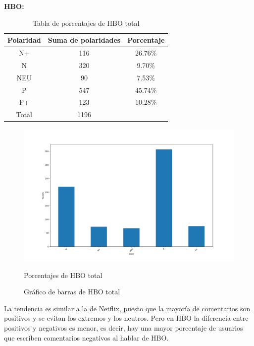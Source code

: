 \textbf{HBO: }


\begin{table}[H]
	\centering
	\begin{tabular}{|c|c|c|}
		\hline 
		Polaridad& Suma de polaridades & Porcentaje \\ 
		\hline 
		N+& 116 & 26.76\% \\ 
		\hline 
		N& 320 &  9.70\%\\ 
		\hline 
		NEU& 90 & 7.53\% \\ 
		\hline 
		P& 547 & 45.74\% \\ 
		\hline 
		P+& 123 & 10.28\% \\ 
		\hline 
		Total & 1196 & \\
		\hline
	\end{tabular} 
	\caption{Tabla de porcentajes de HBO total}
	\label{tbl:porcentaje-HBOAll}
\end{table}

\begin{figure}[H]
	\centering
		
		 \includegraphics[scale=.3]{imagenes/barrasHBOAll.png} 
		
		{Porcentajes de HBO total}
		
	\caption{Gráfico de barras de HBO total} 
		
	\label{fig:HBOAll}
\end{figure}



La tendencia es similar a la de Netflix, puesto que la mayoría de comentarios son positivos y se evitan los extremos y los neutros. Pero en HBO la diferencia entre positivos y negativos es menor, es decir, hay una mayor porcentaje de usuarios que escriben comentarios negativos al hablar de HBO. 



